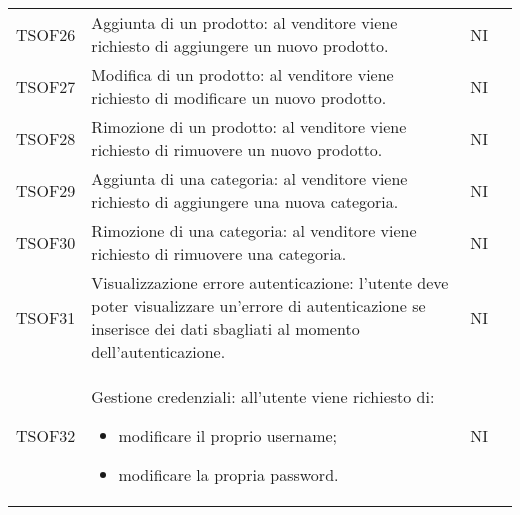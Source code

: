 \begin{center}
\begin{longtable}[!h]{p{50px} p{245px} p{75px} p{50px}}
        TSOF26                           & Aggiunta di un prodotto: al venditore viene richiesto di aggiungere un nuovo prodotto.                                                                              & NI             \\
        TSOF27                           & Modifica di un prodotto: al venditore viene richiesto di modificare un nuovo prodotto.                                                                              & NI             \\
        TSOF28                           & Rimozione di un prodotto: al venditore viene richiesto di rimuovere un nuovo prodotto.                                                                              & NI             \\
        TSOF29                           & Aggiunta di una categoria: al venditore viene richiesto di aggiungere una nuova categoria.                                                                          & NI             \\
        TSOF30                           & Rimozione di una categoria: al venditore viene richiesto di rimuovere una categoria.                                                                                & NI             \\
        TSOF31                           & Visualizzazione errore autenticazione: l'utente deve poter visualizzare un'errore di autenticazione se inserisce dei dati sbagliati al momento dell'autenticazione. & NI             \\
        TSOF32                           & Gestione credenziali: all'utente viene richiesto di: \begin{itemize} \item modificare il proprio username; \item modificare la propria password.\end{itemize}                                                                                    & NI             \\
    \end{longtable}
\end{center}